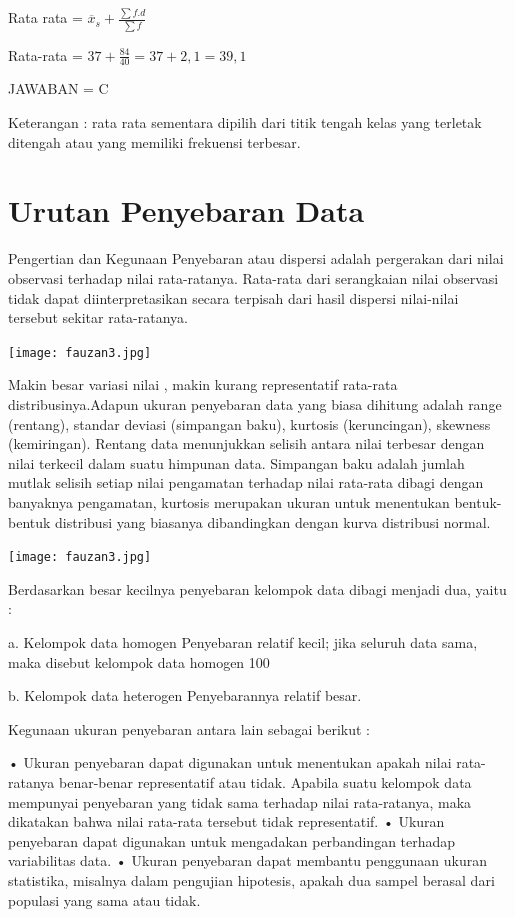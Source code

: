 \documentclass[11pt,fleqn]{book} %
\begin{document}
{Rata rata = $\overline{x}_{s} + \frac{\sum f.d}{\sum f} $

Rata-rata = $ 37 + \frac{84}{40} = 37 + 2,1 = 39,1$

JAWABAN = C

Keterangan :
rata rata sementara dipilih dari titik tengah kelas yang terletak ditengah atau yang memiliki frekuensi terbesar.

\section{Urutan Penyebaran Data}
Pengertian dan Kegunaan
Penyebaran atau dispersi adalah pergerakan dari nilai observasi terhadap nilai rata-ratanya. Rata-rata dari serangkaian nilai observasi tidak dapat diinterpretasikan secara terpisah dari hasil dispersi nilai-nilai tersebut sekitar rata-ratanya.

\texttt{[image: fauzan3.jpg]}

 Makin besar variasi nilai , makin kurang representatif rata-rata distribusinya.Adapun ukuran penyebaran data yang biasa dihitung adalah range (rentang), standar deviasi (simpangan  baku),  kurtosis (keruncingan), skewness (kemiringan). Rentang data menunjukkan selisih antara nilai terbesar dengan nilai terkecil dalam suatu himpunan data. Simpangan baku adalah jumlah mutlak selisih setiap nilai pengamatan terhadap nilai rata-rata dibagi dengan banyaknya pengamatan, kurtosis merupakan ukuran untuk menentukan bentuk-bentuk distribusi yang biasanya dibandingkan dengan kurva distribusi normal.
 
 \texttt{[image: fauzan3.jpg]}


Berdasarkan besar kecilnya penyebaran  kelompok data dibagi menjadi dua, yaitu :

a. Kelompok data homogen 
Penyebaran relatif kecil; jika seluruh data sama, maka disebut kelompok data homogen 100%

b. Kelompok data heterogen 
Penyebarannya relatif besar.

Kegunaan ukuran penyebaran antara lain sebagai berikut :

•	Ukuran penyebaran dapat digunakan untuk menentukan apakah nilai rata-ratanya benar-benar representatif atau tidak. Apabila suatu kelompok data mempunyai penyebaran yang tidak sama terhadap nilai rata-ratanya, maka dikatakan bahwa nilai rata-rata tersebut tidak representatif. 
•	Ukuran penyebaran dapat digunakan untuk mengadakan perbandingan terhadap variabilitas data.
•	Ukuran penyebaran dapat membantu penggunaan ukuran statistika, misalnya dalam pengujian hipotesis, apakah dua sampel berasal dari populasi yang sama atau tidak.


}
\end{document}
